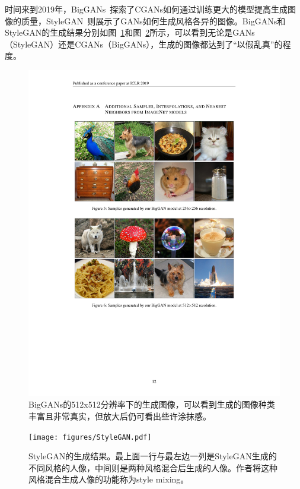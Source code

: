 时间来到2019年，BigGANs~\cite{BigGANs}探索了CGANs如何通过训练更大的模型提高生成图像的质量，StyleGAN~\cite{StyleGAN}则展示了GANs如何生成风格各异的图像。BigGANs和StyleGAN的生成结果分别如图~\ref{BigGAN}和图~\ref{StyleGAN}所示，可以看到无论是GANs（StyleGAN）还是CGANs（BigGANs），生成的图像都达到了“以假乱真”的程度。

\begin{figure}
    \centering
    \includegraphics[width=\textwidth]{figures/BigGAN.pdf}
    \caption{BigGANs的512x512分辨率下的生成图像，可以看到生成的图像种类丰富且非常真实，但放大后仍可看出些许涂抹感。}
    \label{BigGAN}
\end{figure}

\begin{figure}
    \centering
    \texttt{[image: figures/StyleGAN.pdf]}
    \caption{StyleGAN的生成结果。最上面一行与最左边一列是StyleGAN生成的不同风格的人像，中间则是两种风格混合后生成的人像。作者将这种风格混合生成人像的功能称为style mixing。}
    \label{StyleGAN}
\end{figure}


